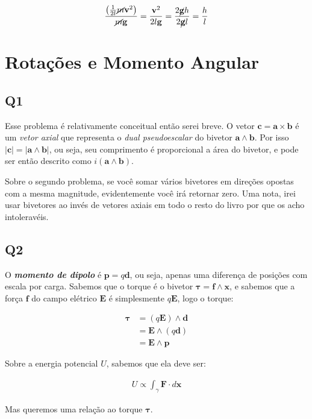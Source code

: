 \documentclass{antiquebook}
\begin{document}
	\begin{align*}
		\frac{ \left ( \frac{1}{2l} \cancel{m} \mathbf{v}^2  \right ) }{\cancel{m}\mathbf{g}} = \frac{\mathbf{v}^2}{2l\mathbf{g}} = 
		\frac{2\cancel{\mathbf{g}}h}{2\cancel{\mathbf{g}}l} = \frac{h}{l}
	\end{align*}



	\chapter{Rotações e Momento Angular}

	\section{Q1}

	Esse problema é relativamente conceitual então serei breve.
	O vetor $\mathbf{c}=\mathbf{a} \times \mathbf{b}$ é um \emph{vetor axial} que representa
	o \emph{dual pseudoescalar} do bivetor $\mathbf{a} \wedge \mathbf{b}$. Por isso
	$|\mathbf{c}| = |\mathbf{a}\wedge \mathbf{b}|$, ou seja, seu comprimento é proporcional
	a área do bivetor, e pode ser então descrito como $i(\mathbf{a}\wedge\mathbf{b})$.

	\vspace{\baselineskip}

	Sobre o segundo problema, se você somar vários bivetores em direções opostas com a mesma
	magnitude, evidentemente você irá retornar zero. Uma nota, irei usar bivetores ao invés
	de vetores axiais em todo o resto do livro por que os acho intoleravéis.

	\section{Q2}

	O \emph{\textbf{momento de dipolo}} é $\mathbf{p} = q\mathbf{d}$, ou seja, apenas uma 
	diferença de posições com escala por carga. Sabemos que o torque é o bivetor 
	$\mathbf{\tau} = \mathbf{f} \wedge \mathbf{x}$, e sabemos que a força $\mathbf{f}$
	do campo elétrico $\mathbf{E}$ é simplesmente $q\mathbf{E}$, logo o torque:

	\begin{align*}
		\mathbf{\tau} &= (q\mathbf{E}) \wedge \mathbf{d} \\
		&= \mathbf{E} \wedge (q\mathbf{d}) \\
		&= \mathbf{E} \wedge \mathbf{p}
	\end{align*}
	
	Sobre a energia potencial $U$, sabemos que ela deve ser:

	\begin{align*}
		U \propto \int_\gamma \mathbf{F}\cdot d\mathbf{x}
	\end{align*}

	Mas queremos uma relação ao torque $\mathbf{\tau}$.
\end{document}
